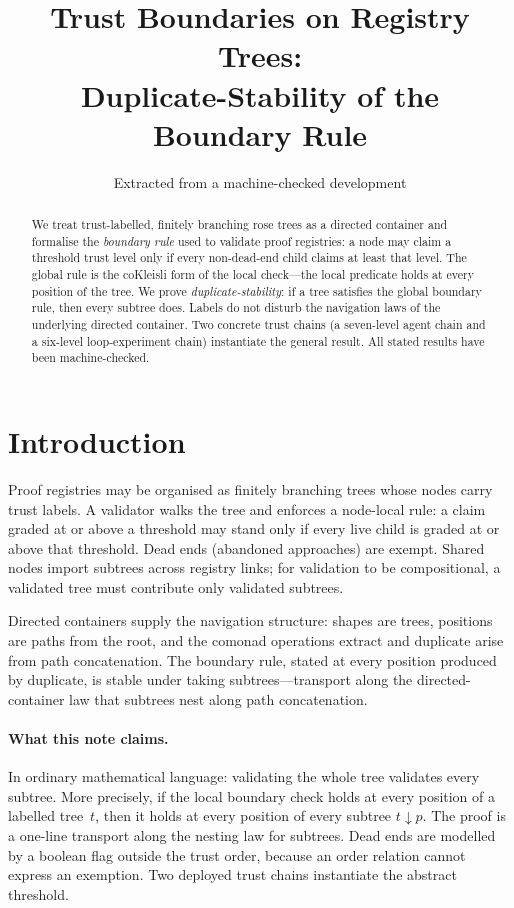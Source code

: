 \documentclass[11pt,a4paper]{article}
\title{Trust Boundaries on Registry Trees:\\
  Duplicate-Stability of the Boundary Rule}
\author{Extracted from a machine-checked development}
\date{}
\theoremstyle{plain}
\theoremstyle{definition}
\begin{document}
\maketitle

\begin{abstract}
We treat trust-labelled, finitely branching rose trees as a directed
container and formalise the \emph{boundary rule} used to validate proof
registries: a node may claim a threshold trust level only if every
non-dead-end child claims at least that level. The global rule is the
coKleisli form of the local check---the local predicate holds at every
position of the tree. We prove \emph{duplicate-stability}: if a tree
satisfies the global boundary rule, then every subtree does. Labels do
not disturb the navigation laws of the underlying directed container.
Two concrete trust chains (a seven-level agent chain and a six-level
loop-experiment chain) instantiate the general result. All stated
results have been machine-checked.
\end{abstract}

\tableofcontents
\bigskip

\section{Introduction}

Proof registries may be organised as finitely branching trees whose
nodes carry trust labels. A validator walks the tree and enforces a
node-local rule: a claim graded at or above a threshold may stand only
if every live child is graded at or above that threshold. Dead ends
(abandoned approaches) are exempt. Shared nodes import subtrees across
registry links; for validation to be compositional, a validated tree
must contribute only validated subtrees.

Directed containers supply the navigation structure: shapes are trees,
positions are paths from the root, and the comonad operations
$\mathrm{extract}$ and $\mathrm{duplicate}$ arise from path
concatenation. The boundary rule, stated at every position produced by
$\mathrm{duplicate}$, is stable under taking subtrees---transport along
the directed-container law that subtrees nest along path concatenation.

\paragraph{What this note claims.}
In ordinary mathematical language: validating the whole tree validates
every subtree. More precisely, if the local boundary check holds at
every position of a labelled tree~$t$, then it holds at every position
of every subtree $t \mathbin{\downarrow} p$. The proof is a one-line
transport along the nesting law for subtrees. Dead ends are modelled by
a boolean flag outside the trust order, because an order relation cannot
express an exemption. Two deployed trust chains instantiate the abstract
threshold.
\end{document}
